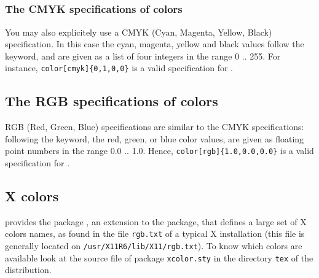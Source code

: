 \documentclass[12pt]{article}
\begin{document}
{\color[named]{Emerald}{Emerald}} $\quad$
{\color[named]{JungleGreen}{JungleGreen}} $\quad$
{\color[named]{SeaGreen}{SeaGreen}} $\quad$
{\color[named]{Green}{Green}} $\quad$
{\color[named]{ForestGreen}{ForestGreen}} $\quad$

{\color[named]{PineGreen}{PineGreen}} $\quad$
{\color[named]{LimeGreen}{LimeGreen}} $\quad$
{\color[named]{YellowGreen}{YellowGreen}} $\quad$
{\color[named]{SpringGreen}{SpringGreen}} $\quad$

{\color[named]{OliveGreen}{OliveGreen}} $\quad$
{\color[named]{RawSienna}{RawSienna}} $\quad$
{\color[named]{Sepia}{Sepia}} $\quad$
{\color[named]{Brown}{Brown}} $\quad$
{\color[named]{Tan}{Tan}} $\quad$

{\color[named]{Gray}{Gray}} $\quad$
{\color[named]{Black}{Black}} $\quad$

\subsubsection*{The CMYK specifications of colors}

You may also explicitely use a CMYK (Cyan, Magenta, Yellow, Black)
specification. In this case the cyan, magenta, yellow and black values
follow the \docid{cmyk} keyword, and are given as a list of four
integers in the range 0 .. 255.
For instance, {\tt {}color[cmyk]\{0,1,0,0\}} is a valid specification
for {\color[cmyk]{0,1,0,0}{magenta}}.

\subsection*{The RGB specifications of colors}

RGB (Red, Green, Blue) specifications are similar to the CMYK
specifications: following the  keyword, the red, green, or
blue color values, are given as floating point numbers in the range
0.0 .. 1.0.  Hence, {\tt{{\char92}color[rgb]\{1.0,0.0,0.0\}}} is a
valid specification for {\color[rgb]{1.0,0.0,0.0}{red}}.

\subsection*{X colors}

{\ActiveDVI} provides the package , an extension to the
\doctt{color} package, that defines a large set of X colors names, as
found in the file {\tt rgb.txt} of a typical X installation (this file
is generally located on {\tt /usr/X11R6/lib/X11/rgb.txt}). To know
which colors are available look at the source file of package
{\tt xcolor.sty} in the directory {\tt tex} of the distribution.
\end{document}

